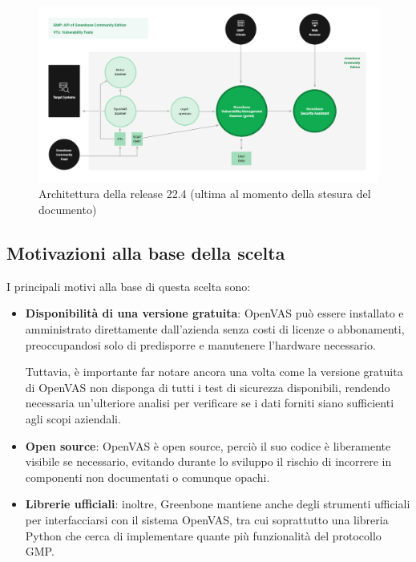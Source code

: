 \begin{figure}
    \includegraphics[width=\textwidth]{img/greenbone-community-22.4-architecture.png}
    \caption{Architettura della release 22.4 (ultima al momento della stesura del documento)}
\end{figure}


\subsection{Motivazioni alla base della scelta}
I principali motivi alla base di questa scelta sono:
\begin{itemize}
    \item \textbf{Disponibilità di una versione gratuita}: OpenVAS può essere installato e amministrato direttamente dall'azienda senza costi di licenze o abbonamenti, preoccupandosi solo di predisporre e manutenere l'hardware necessario.
    
    Tuttavia, è importante far notare ancora una volta come la versione gratuita di OpenVAS non disponga di tutti i test di sicurezza disponibili, rendendo necessaria un'ulteriore analisi per verificare se i dati forniti siano sufficienti agli scopi aziendali.

    \item \textbf{Open source}: OpenVAS è open source, perciò il suo codice è liberamente visibile se necessario, evitando durante lo sviluppo il rischio di incorrere in componenti non documentati o comunque opachi.
    
    \item \textbf{Librerie ufficiali}: inoltre, Greenbone mantiene anche degli strumenti ufficiali per interfacciarsi con il sistema OpenVAS, tra cui soprattutto una libreria Python che cerca di implementare quante più funzionalità del protocollo GMP.
\end{itemize}